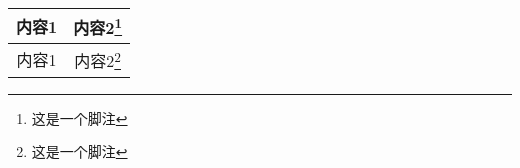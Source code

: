 \documentclass{ctexart}
\begin{document}

\begin{longtable}{|c|c|}
\hline
内容1 & 内容2\footnote{这是一个脚注} \\
\hline
内容1 & 内容2\footnote{这是一个脚注} \\
\hline
\end{longtable}
\end{document}
